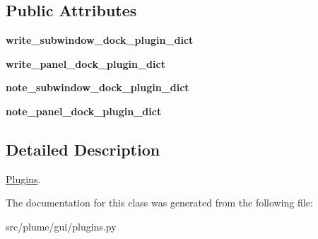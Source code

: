 \subsection*{Public Attributes}
\begin{DoxyCompactItemize}
\item 
{\bfseries write\+\_\+subwindow\+\_\+dock\+\_\+plugin\+\_\+dict}\hypertarget{classplume-creator_1_1src_1_1plume_1_1gui_1_1plugins_1_1_plugins_aec9b28caa63fbef82f48ecf0d5019b59}{}\label{classplume-creator_1_1src_1_1plume_1_1gui_1_1plugins_1_1_plugins_aec9b28caa63fbef82f48ecf0d5019b59}

\item 
{\bfseries write\+\_\+panel\+\_\+dock\+\_\+plugin\+\_\+dict}\hypertarget{classplume-creator_1_1src_1_1plume_1_1gui_1_1plugins_1_1_plugins_afc038fb5ea2c5c9f51f15cf0d8838ea3}{}\label{classplume-creator_1_1src_1_1plume_1_1gui_1_1plugins_1_1_plugins_afc038fb5ea2c5c9f51f15cf0d8838ea3}

\item 
{\bfseries note\+\_\+subwindow\+\_\+dock\+\_\+plugin\+\_\+dict}\hypertarget{classplume-creator_1_1src_1_1plume_1_1gui_1_1plugins_1_1_plugins_a76e9845393860a5aac5ad61f9a83a8f0}{}\label{classplume-creator_1_1src_1_1plume_1_1gui_1_1plugins_1_1_plugins_a76e9845393860a5aac5ad61f9a83a8f0}

\item 
{\bfseries note\+\_\+panel\+\_\+dock\+\_\+plugin\+\_\+dict}\hypertarget{classplume-creator_1_1src_1_1plume_1_1gui_1_1plugins_1_1_plugins_aa269bff44b5144edb74be8c5be55f17e}{}\label{classplume-creator_1_1src_1_1plume_1_1gui_1_1plugins_1_1_plugins_aa269bff44b5144edb74be8c5be55f17e}

\end{DoxyCompactItemize}


\subsection{Detailed Description}
\hyperlink{classplume-creator_1_1src_1_1plume_1_1gui_1_1plugins_1_1_plugins}{Plugins}. 

The documentation for this class was generated from the following file\+:\begin{DoxyCompactItemize}
\item 
src/plume/gui/plugins.\+py\end{DoxyCompactItemize}
